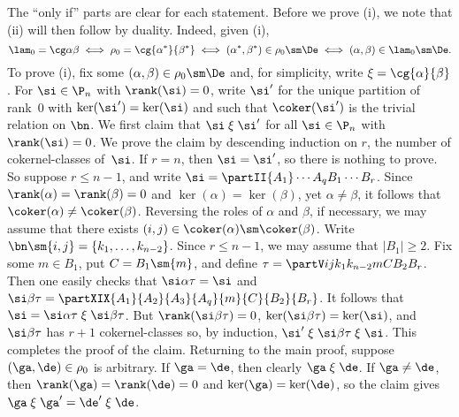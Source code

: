 \pf The ``only if'' parts are clear for each statement.
%
Before we prove (i), we note that (ii) will then follow by duality.  Indeed, given (i),
\[
\lam_0=\cg\alpha\beta \iff \rho_0=\cg{\alpha^*}{\beta^*} \iff (\alpha^*,\beta^*)\in\rho_0\sm\De \iff (\alpha,\beta)\in\lam_0\sm\De.
\]
To prove (i), 
fix some $(\alpha,\beta)\in\rho_0\sm\De$ and, for simplicity, write ${\mathrel\xi}=\cg{\alpha}{\beta}$.  For $\si\in\P_n$ with $\rank(\si)=0$, write $\si'$ for the unique partition of rank~$0$ with $\ker(\si')=\ker(\si)$ and such that $\coker(\si')$ is the trivial relation on $\bn$.  
%
We first claim that $\si\mathrel\xi\si'$ for all $\si\in\P_n$ with $\rank(\si)=0$.  We prove the claim by descending induction on $r$, the number of cokernel-classes of~$\si$.  If $r=n$, then $\si=\si'$, so there is nothing to prove.  So suppose
$r\leq n-1$, and write $\si=\partII{A_1}\cdots{A_q}{B_1}\cdots{B_r}$.
%
Since $\rank(\alpha)=\rank(\beta)=0$ and $\ker(\alpha)=\ker(\beta)$, yet $\alpha\not=\beta$, it follows that $\coker(\alpha)\not=\coker(\beta)$.  Reversing the roles of $\alpha$ and $\beta$, if necessary, we may assume that there exists $(i,j)\in\coker(\alpha)\sm\coker(\beta)$.  
Write $\bn\sm\{i,j\}=\{k_1,\ldots,k_{n-2}\}$.
%
Since $r\leq n-1$, we may assume that $|B_1|\geq2$.  Fix some $m\in B_1$, put $C=B_1\sm\{m\}$, and define $\tau=\partV ij{k_1}{k_{n-2}}{m}{C}{B_2}{B_r}$.
%
Then one easily checks that $\si\alpha\tau = \si$ and $\si\beta\tau = \partXIX{A_1}{A_2}{A_3}{A_q}{m}{C}{B_2}{B_r}$.  It follows that $\si=\si\alpha\tau\mathrel\xi\si\beta\tau$.  But $\rank(\si\beta\tau)=0$, $\ker(\si\beta\tau)=\ker(\si)$, and $\si\beta\tau$ has $r+1$ cokernel-classes so, by induction, $\si'\mathrel\xi\si\beta\tau\mathrel\xi\si$.  This completes the proof of the claim.  
%
Returning to the main proof, suppose $(\ga,\de)\in\rho_0$ is arbitrary.  If $\ga=\de$, then clearly $\ga\mathrel\xi\de$.  If $\ga\not=\de$, then $\rank(\ga)=\rank(\de)=0$ and $\ker(\ga)=\ker(\de)$, so the claim gives $\ga\mathrel\xi\ga'=\de'\mathrel\xi\de$. 


